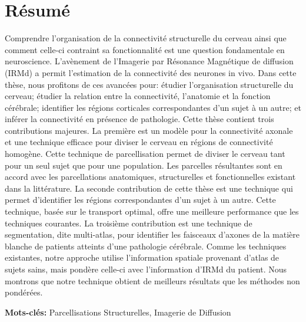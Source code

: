\chapter{Résumé}
Comprendre l'organisation de la connectivité
structurelle du cerveau ainsi que comment celle-ci contraint sa fonctionnalité
est une question fondamentale en neuroscience. L'avènement de l'Imagerie par
Résonance Magnétique de diffusion (IRMd) a permit l'estimation de la connectivité
des neurones in vivo. Dans cette thèse, nous profitons de ces avancées pour:
étudier l'organisation structurelle du cerveau; étudier la relation entre la
connectivité, l'anatomie et la fonction cérébrale; identifier les régions
corticales correspondantes d'un sujet à un autre; et inférer la connectivité
en présence de pathologie. Cette thèse contient trois contributions majeures.
La première est un modèle pour la connectivité axonale et une technique efficace
pour diviser le cerveau en régions de connectivité homogène. Cette technique de
parcellisation permet de diviser le cerveau tant pour un seul sujet que pour une
population. Les parcelles résultantes sont en accord avec les parcellations
anatomiques, structurelles et fonctionnelles existant dans la littérature. 
La seconde contribution de cette thèse est une technique qui permet
d'identifier les régions correspondantes d'un sujet à un autre. Cette technique,
basée sur le transport optimal, offre une meilleure performance que les techniques
courantes. La troisième contribution est une technique de segmentation, dite
multi-atlas, pour identifier les faisceaux d'axones de la matière blanche de
patients atteints d'une pathologie cérébrale. Comme les techniques existantes,
notre approche utilise l'information spatiale provenant d'atlas de sujets sains,
mais pondère celle-ci avec l'information d'IRMd du patient. Nous montrons que
notre technique obtient de meilleurs résultats que les méthodes non pondérées.

\vspace{1cm}

\textbf{Mots-cl\'es:} Parcellisations Structurelles, Imagerie de Diffusion

